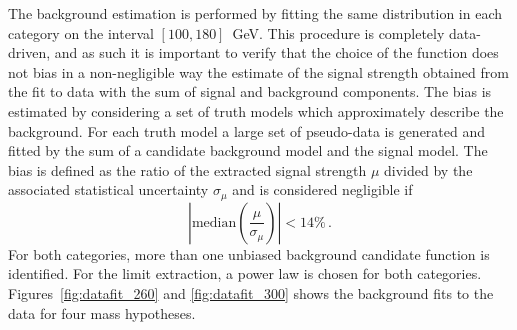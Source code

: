 The background estimation is performed by fitting the same distribution in each category on the interval
$[100, 180]$~GeV. This procedure is completely data-driven, and as such it is important
to verify that the choice of the function does not bias in a non-negligible way the
estimate of the signal
strength obtained from the fit to data with the sum of signal and background components.
The bias is estimated by considering a set of truth models which approximately describe the background.
For each truth model a large set of pseudo-data is generated and fitted by the sum of a candidate
background model and the signal model. The bias is defined as the ratio of the extracted signal strength
$\mu$ divided by the associated statistical uncertainty $\sigma_\mu$ and
is considered negligible if
\begin{equation}
\left|\text{median}\left(\frac{\mu}{\sigma_\mu}\right)\right| < 14\% \,.
\end{equation}
For both categories, more than one unbiased background candidate function is identified.
For the limit extraction,
a power law is chosen for both categories. Figures~\ref{fig:datafit_260} and \ref{fig:datafit_300}
shows the background fits to the data for four mass hypotheses.

